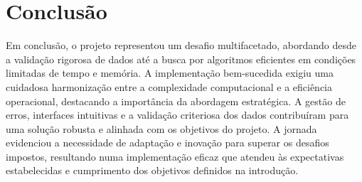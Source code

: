 \documentclass[12pt,a4paper]{article}
\begin{document}
    \section{Conclusão}
    \hspace{0,6cm}Em conclusão, o projeto representou um desafio multifacetado, abordando desde a validação rigorosa de dados até a busca por algoritmos eficientes em condições limitadas de tempo e memória. A implementação bem-sucedida exigiu uma cuidadosa harmonização entre a complexidade computacional e a eficiência operacional, destacando a importância da abordagem estratégica. A gestão de erros, interfaces intuitivas e a validação criteriosa dos dados contribuíram para uma solução robusta e alinhada com os objetivos do projeto. A jornada evidenciou a necessidade de adaptação e inovação para superar os desafios impostos, resultando numa implementação eficaz que atendeu às expectativas estabelecidas e cumprimento dos objetivos definidos na introdução.
        
\end{document}
